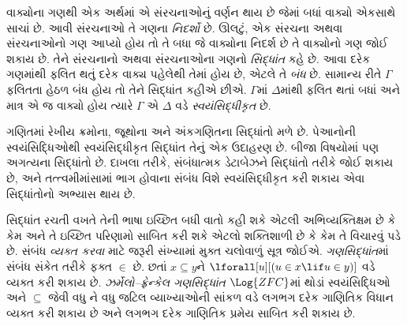 વાક્યોના ગણથી એક અર્થમાં એ સંરચનાઓનું વર્ણન થાય છે જેમાં બધાં વાક્યો એકસાથે સાચાં છે. આવી સંરચનાઓ તે ગણના \emph{નિદર્શો} છે. ઊલટું, એક સંરચના અથવા સંરચનાઓનો ગણ આપ્યો હોય તો તે બધા જે વાક્યોના નિદર્શ છે તે વાક્યોનો ગણ જોઈ શકાય છે. તેને સંરચનાનો અથવા સંરચનાઓના ગણનો \emph{સિદ્ધાંત} કહે છે. આવા દરેક ગણમાંથી ફલિત થતું દરેક વાક્ય પહેલેથી તેમાં હોય છે, એટલે તે \emph{બંધ} છે. સામાન્ય રીતે $\Gamma$ ફલિતતા હેઠળ બંધ હોય તો તેને સિદ્ધાંત કહીએ છીએ. $\Gamma$માં $\Delta$માંથી ફલિત થતાં બધાં અને માત્ર એ જ વાક્યો હોય ત્યારે $\Gamma$ એ $\Delta$ વડે \emph{સ્વયંસિદ્ધીકૃત} છે.

ગણિતમાં રેખીય ક્રમોના, જૂથોના અને અંકગણિતના સિદ્ધાંતો મળે છે. પેઆનોની સ્વયંસિદ્ધિઓથી સ્વયંસિદ્ધીકૃત સિદ્ધાંત તેનું એક ઉદાહરણ છે. બીજા વિષયોમાં પણ અગત્યના સિદ્ધાંતો છે. દાખલા તરીકે, સંબંધાત્મક ડેટાબેઝને સિદ્ધાંતો તરીકે જોઈ શકાય છે, અને તત્ત્વમીમાંસામાં ભાગ હોવાના સંબંધ વિશે સ્વયંસિદ્ધીકૃત કરી શકાય એવા સિદ્ધાંતોનો અભ્યાસ થાય છે.

સિદ્ધાંત રચતી વખતે તેની ભાષા ઇચ્છિત બધી વાતો કહી શકે એટલી અભિવ્યક્તિક્ષમ છે કે કેમ અને તે ઇચ્છિત પરિણામો સાબિત કરી શકે એટલો શક્તિશાળી છે કે કેમ તે વિચારવું પડે છે. સંબંધ \emph{વ્યક્ત કરવા} માટે જરૂરી સંખ્યામાં મુક્ત ચલોવાળું સૂત્ર જોઈએ. \emph{ગણસિદ્ધાંત}માં સંબંધ સંકેત તરીકે ફક્ત $\in$ છે. છતાં $x\subseteq y$ને $\lforall[u][(u\in x\lif u\in y)]$ વડે વ્યક્ત કરી શકાય છે. \emph{ઝર્મેલો–ફ્રેન્કેલ ગણસિદ્ધાંત} $\Log{ZFC}$માં થોડાં સ્વયંસિદ્ધિઓ અને $\subseteq$ જેવી વધુ ને વધુ જટિલ વ્યાખ્યાઓની સાંકળ વડે લગભગ દરેક ગાણિતિક વિધાન વ્યક્ત કરી શકાય છે અને લગભગ દરેક ગાણિતિક પ્રમેય સાબિત કરી શકાય છે.
